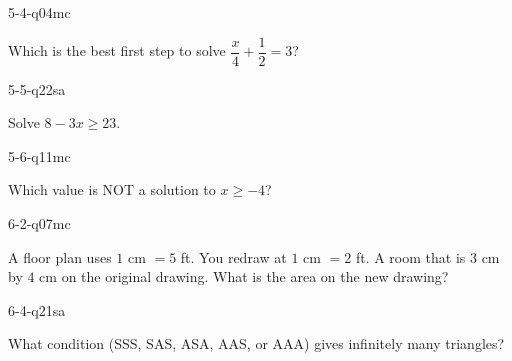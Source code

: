 \begin{practiceQuestion}{5-4-q04}{mc}
\begin{questionText}
Which is the best first step to solve $\dfrac{x}{4} + \dfrac{1}{2} = 3$?
\end{questionText}
\end{practiceQuestion}

\begin{practiceQuestion}{5-5-q22}{sa}
\begin{questionText}
Solve $8 - 3x \geq 23$.
\end{questionText}
\end{practiceQuestion}

\begin{practiceQuestion}{5-6-q11}{mc}
\begin{questionText}
Which value is NOT a solution to $x \geq -4$?
\end{questionText}
\end{practiceQuestion}

\begin{practiceQuestion}{6-2-q07}{mc}
\begin{questionText}
A floor plan uses $1$ cm $= 5$ ft. You redraw at $1$ cm $= 2$ ft. A room that is $3$ cm by $4$ cm on the original drawing. What is the area on the new drawing?
\end{questionText}
\end{practiceQuestion}

\begin{practiceQuestion}{6-4-q21}{sa}
\begin{questionText}
What condition (SSS, SAS, ASA, AAS, or AAA) gives infinitely many triangles?
\end{questionText}
\end{practiceQuestion}

